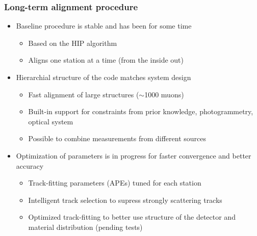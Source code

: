 \documentclass[compress]{beamer}
\begin{document}
\begin{frame}
\frametitle{Long-term alignment procedure}
\begin{itemize}\setlength{\itemsep}{0.4 cm}
\item Baseline procedure is stable and has been for some time
\begin{itemize}\setlength{\itemsep}{0.15 cm}
\item Based on the HIP algorithm
\item Aligns one station at a time (from the inside out)
\end{itemize}
\item Hierarchial structure of the code matches system design
\begin{itemize}\setlength{\itemsep}{0.15 cm}
\item Fast alignment of large structures ($\sim$1000 muons)
\item Built-in support for constraints from prior knowledge,
photogrammetry, optical system
\item Possible to combine measurements from different sources
\end{itemize}
\item Optimization of parameters is in progress for faster convergence
and better accuracy
\begin{itemize}\setlength{\itemsep}{0.15 cm}
\item Track-fitting parameters (APEs) tuned for each station
\item Intelligent track selection to supress strongly scattering tracks
\item Optimized track-fitting to better use structure of the detector
and material distribution (pending tests)
\end{itemize}
\end{itemize}
\end{frame}
\end{document}
